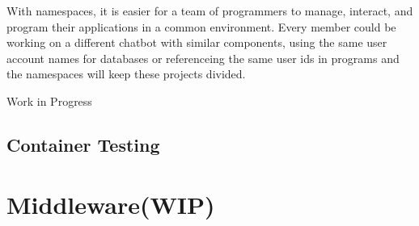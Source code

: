\documentclass{article}
\begin{document}
With namespaces, it is easier for a team of programmers to manage, interact, and program their applications in a common environment. Every member could be working on a different chatbot with similar components, using the same user account names for databases or referenceing the same user ids in programs and the namespaces will keep these projects divided.

\noindent\makebox[\textwidth]{\rule{\textwidth}{7pt}} Work in Progress
\subsection{Container Testing}
 


\section{Middleware(WIP)}

%
\end{document}
